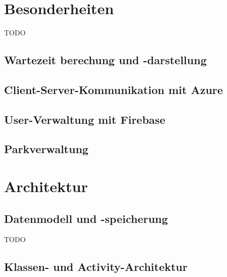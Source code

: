 \section{Besonderheiten}
\label{sec:implementierung:besonderheiten}

TODO

\subsection{Wartezeit berechung und -darstellung}
\label{sec:implementierung:besonderheiten:wartezeit}

\subsection{Client-Server-Kommunikation mit Azure}
\label{sec:implementierung:besonderheiten:azure}


\subsection{User-Verwaltung mit Firebase}
\label{sec:implementierung:besonderheiten:firebase}


\subsection{Parkverwaltung}
\label{sec:implementierung:besonderheiten:parkverwaltung}



\section{Architektur}
\label{sec:implementierung:architektur}

\subsection{Datenmodell und -speicherung}
\label{sec:implementierung:architektur:datenmodell}

TODO

\subsection{Klassen- und Activity-Architektur}
\label{sec:implementierung:architektur:klassenmodell}

